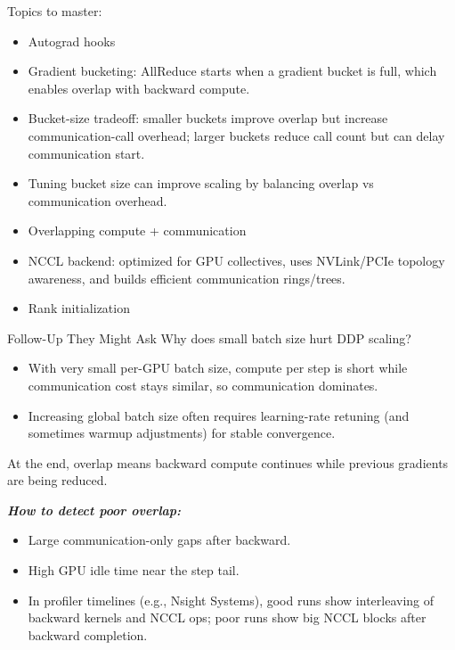 \documentclass[12pt]{article}
\let\origtextbf\textbf
\renewcommand{\textbf}[1]{\origtextbf{\textit{#1}}}
\begin{document}
Topics to master:
\begin{itemize}
\item Autograd hooks
\item Gradient bucketing: AllReduce starts when a gradient bucket is full, which enables overlap with backward compute.
\item Bucket-size tradeoff: smaller buckets improve overlap but increase communication-call overhead; larger buckets reduce call count but can delay communication start.
\item Tuning bucket size can improve scaling by balancing overlap vs communication overhead.
\item Overlapping compute + communication
\item NCCL backend: optimized for GPU collectives, uses NVLink/PCIe topology awareness, and builds efficient communication rings/trees.
\item Rank initialization
\end{itemize}

\begin{redbox}{Follow-Up They Might Ask}
Why does small batch size hurt DDP scaling?
\begin{itemize}
\item With very small per-GPU batch size, compute per step is short while communication cost stays similar, so communication dominates.
\item Increasing global batch size often requires learning-rate retuning (and sometimes warmup adjustments) for stable convergence.
\end{itemize}
\end{redbox}


At the end, overlap means backward compute continues while previous gradients are being reduced.

\textbf{How to detect poor overlap:}
\begin{itemize}
\item Large communication-only gaps after backward.
\item High GPU idle time near the step tail.
\item In profiler timelines (e.g., Nsight Systems), good runs show interleaving of backward kernels and NCCL ops; poor runs show big NCCL blocks after backward completion.
\end{itemize}
\end{document}
